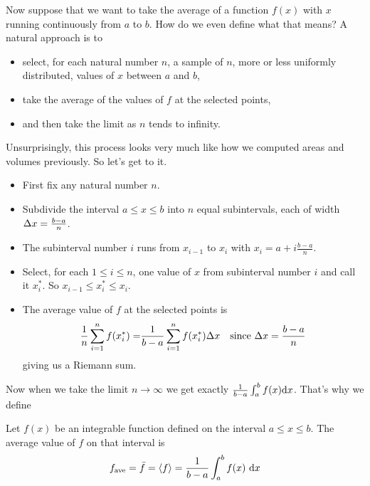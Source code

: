 Now suppose that we want to take the average of a function $f(x)$ with $x$ running
continuously from $a$ to $b$. How do we even define what that means? A natural approach is
to
\begin{itemize}
\item select, for each natural number $n$, a sample of $n$, more or
less uniformly distributed, values of $x$ between $a$ and $b$,
\item take the average of the values of $f$ at the selected points,
\item and then take the limit as $n$ tends to infinity.
\end{itemize}
Unsurprisingly, this process looks very much like how we computed areas and volumes
previously. So let's get to it.
\begin{itemize}
\item
First fix any natural number $n$.
\item
Subdivide the interval $a\le x\le b$ into $n$ equal subintervals,
each of width $\Delta x=\frac{b-a}{n}$.
\item
The subinterval number $i$ runs from $x_{i-1}$ to $x_i$ with
$x_i=a+i\frac{b-a}{n}$.
\item
Select, for each $1\le i\le n$, one value of $x$
from subinterval number $i$ and call it $x_i^*$.
So $x_{i-1}\le x_i^*\le x_i$.
\item
The average value of $f$ at the selected points is
\begin{align*}
\frac{1}{n}\sum_{i=1}^n f(x_i^*)
=&\frac{1}{b-a}\sum_{i=1}^n f(x_i^*) \Delta x
&\text{since $\Delta x=\frac{b-a}{n}$}
\end{align*}
giving us a Riemann sum.
\end{itemize}
Now when we take the limit $n\rightarrow\infty$
we get exactly $\frac{1}{b-a}\int_a^b f(x)\mathrm{d}x$. That's why we define
\begin{defn}\label{def:AVaverage}
Let $f(x)$ be an integrable function defined on the interval
$a\le x\le b$. The average value of $f$ on that interval is
\begin{align*}
f_{\mathrm{ave}}=\bar f=\left< f\right>
=\frac{1}{b-a}\int_a^b f(x)\ \mathrm{d}x
\end{align*}
\end{defn}


